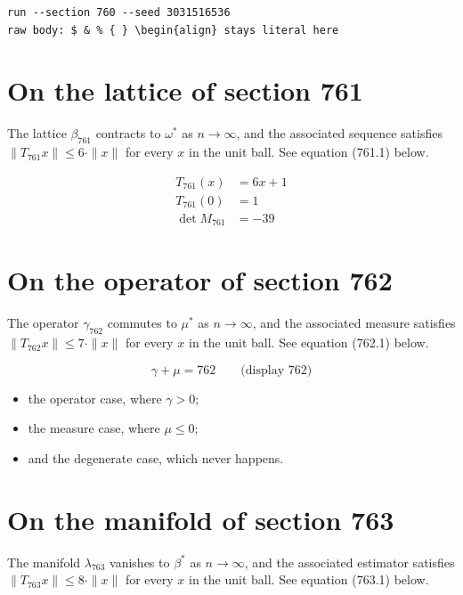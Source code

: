 \documentclass{article}
\begin{document}
\begin{verbatim}
run --section 760 --seed 3031516536
raw body: $ & % { } \begin{align} stays literal here
\end{verbatim}

\section{On the lattice of section 761}
The lattice $\beta_{761}$ contracts to $\omega^{*}$ as $n \to \infty$,
and the associated sequence satisfies $\|T_{761} x\| \leq 6 \cdot \|x\|$
for every $x$ in the unit ball. See equation (761.1) below.

\begin{align}
T_{761}(x) &= 6 x + 1 \\
T_{761}(0) &= 1 \\
\det M_{761} &= -39
\end{align}

\section{On the operator of section 762}
The operator $\gamma_{762}$ commutes to $\mu^{*}$ as $n \to \infty$,
and the associated measure satisfies $\|T_{762} x\| \leq 7 \cdot \|x\|$
for every $x$ in the unit ball. See equation (762.1) below.

$$
\gamma + \mu = 762 \qquad \text{(display 762)}
$$

\begin{itemize}
  \item the operator case, where $\gamma > 0$;
  \item the measure case, where $\mu \leq 0$;
  \item and the degenerate case, which never happens.
\end{itemize}

\section{On the manifold of section 763}
The manifold $\lambda_{763}$ vanishes to $\beta^{*}$ as $n \to \infty$,
and the associated estimator satisfies $\|T_{763} x\| \leq 8 \cdot \|x\|$
for every $x$ in the unit ball. See equation (763.1) below.
\end{document}
